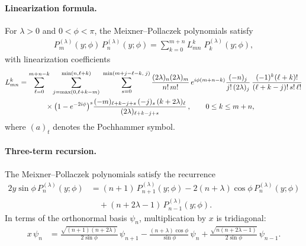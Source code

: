 \documentclass[a4paper,11pt]{article}
\numberwithin{equation}{section}
\theoremstyle{plain}
\theoremstyle{definition}
\theoremstyle{remark}
\newcommand{\1}{\ensuremath{\mathds{1}}\xspace}
\begin{document}
\paragraph{Linearization formula.}
For $\lambda>0$ and $0<\phi<\pi$, the Meixner--Pollaczek polynomials satisfy
\begin{align}
P_m^{(\lambda)}(y;\phi)\,P_n^{(\lambda)}(y;\phi)
=\sum_{k=0}^{m+n} L^k_{mn}\;P_k^{(\lambda)}(y;\phi),
\end{align}
with linearization coefficients
\begin{align}
L^k_{mn}
&=
\sum_{\ell=0}^{m+n-k}\;
\sum_{j=\max(0,\ell+k-m)}^{\min(n,\ell+k)}\;
\sum_{s=0}^{\min(m+j-\ell-k,\;j)}
\frac{(2\lambda)_n(2\lambda)_m}{n!\,m!}\,e^{i\phi(m+n-k)}
\frac{(-n)_j}{j!\,(2\lambda)_j}\,
\frac{(-1)^k(\ell+k)!}{(\ell+k-j)!\,s!\,\ell!}\nonumber\\
&\hspace{3.6em}\times
\big(1-e^{-2i\phi}\big)^s 
\frac{(-m)_{\ell+k-j+s}\,(-j)_s\,(k+2\lambda)_\ell}{(2\lambda)_{\ell+k-j+s}}\,,
\qquad 0\le k\le m+n,
\end{align}
where $(a)_t$ denotes the Pochhammer symbol.
\paragraph{Three-term recursion.}
The Meixner--Pollaczek polynomials satisfy the recurrence
\begin{align}
2y\sin\phi\,P_n^{(\lambda)}(y;\phi)
&=
(n+1)\,P_{n+1}^{(\lambda)}(y;\phi)
-
2(n+\lambda)\cos\phi\,P_n^{(\lambda)}(y;\phi)
\\
&\quad
+
(n+2\lambda-1)\,P_{n-1}^{(\lambda)}(y;\phi).
\end{align}
In terms of the orthonormal basis $\psi_n$, multiplication by $x$ is tridiagonal:
\begin{align}
x\,\psi_n
&=
\frac{\sqrt{(n+1)(n+2\lambda)}}{2\sin\phi}\,\psi_{n+1}
-
\frac{(n+\lambda)\cos\phi}{\sin\phi}\,\psi_n
+
\frac{\sqrt{n(n+2\lambda-1)}}{2\sin\phi}\,\psi_{n-1}.
\end{align}
\end{document}
